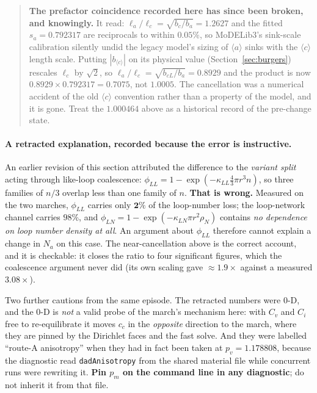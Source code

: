\documentclass[11pt]{article}
\newcommand{\aloop}{\ensuremath{\langle a\rangle}}
\newcommand{\cloop}{\ensuremath{\langle c\rangle}}
\newcommand{\MoD}{\textsf{MoDELib3}}
\newcommand{\code}[1]{\texttt{\small #1}}
\begin{document}
\begin{quote}
\textbf{The prefactor coincidence recorded here has since been broken, and
knowingly.} It read: $\ell_a/\ell_c = \sqrt{b_c/b_a} = 1.2627$ and the fitted
$s_a = 0.792317$ are reciprocals to within $0.05\%$, so \MoD{}'s sink-scale
calibration silently undid the legacy model's sizing of \aloop{} sinks with the
\cloop{} length scale. Putting $|b_{\cloop{}}|$ on its physical value
(Section~\ref{sec:burgers}) rescales $\ell_c$ by $\sqrt2$, so
$\ell_a/\ell_c = \sqrt{b_{cL}/b_a} = 0.8929$ and the product is now
$0.8929 \times 0.792317 = 0.7075$, not $1.0005$. The cancellation was a
numerical accident of the old \cloop{} convention rather than a property of the
model, and it is gone. Treat the $1.000464$ above as a historical record of the
pre-change state.
\end{quote}

\paragraph{A retracted explanation, recorded because the error is instructive.}
An earlier revision of this section attributed the difference to the
\emph{variant split} acting through like-loop coalescence: $\phi_{LL} = 1 -
\exp(-\kappa_{LL}\tfrac43\pi r^3 n)$, so three families of $n/3$ overlap less
than one family of $n$. \textbf{That is wrong.} Measured on the two marches,
$\phi_{LL}$ carries only $\mathbf{2\%}$ of the loop-number loss; the
loop-network channel carries $98\%$, and $\phi_{LN} = 1 - \exp(-\kappa_{LN}\pi
r^2 \rho_N)$ contains \emph{no dependence on loop number density at all}. An
argument about $\phi_{LL}$ therefore cannot explain a change in $N_a$ on this
case. The near-cancellation above is the correct account, and it is checkable:
it closes the ratio to four significant figures, which the coalescence argument
never did (its own scaling gave $\approx 1.9\times$ against a measured
$3.08\times$).

Two further cautions from the same episode. The retracted numbers were 0-D, and
the 0-D is \emph{not} a valid probe of the march's mechanism here: with $C_v$ and
$C_i$ free to re-equilibrate it moves $c_c$ in the \emph{opposite} direction to
the march, where they are pinned by the Dirichlet faces and the fast solve. And
they were labelled ``route-A anisotropy'' when they had in fact been taken at
$p_v = 1.178808$, because the diagnostic read \code{dadAnisotropy} from the
shared material file while concurrent runs were rewriting it. \textbf{Pin $p_m$
on the command line in any diagnostic}; do not inherit it from that file.
\end{document}
